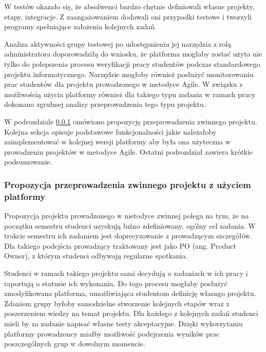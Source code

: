 W testów okazało się, że absolwenci bardzo chętnie definiowali własne projekty, etapy, integracje.
Z zaangażowaniem dodawali oni przypadki testowe i tworzyli programy spełniające założenia kolejnych zadań.

Analiza aktywności grupy testowej po udostępnieniu jej narzędzia z rolą administratora doporowadziłą do wniosku, że platforma mogłaby zostać użyta nie tylko do polepszenia procesu weryfikacji pracy studentów podczas standardowego projektu informatycznego.
Narzędzie mogłoby również posłużyć monitorowaniu prac studentów dla projektu prowadzonego w metodyce Agile.
W związku z możliwością użycia platformy również dla takiego typu zadania w ramach pracy dokonano zgrubnej analizy przeprowadzenia tego typu projektu.

W podrozdziale \ref{agile_proposition} omówiono propozycję przeprowadzenia zwinnego projektu.
Kolejna sekcja opisuje podstawowe funkcjonalności jakie należałoby zaimplementować w kolejnej wersji platformy aby była ona użyteczna w prowadzeniu projektów w metodyce Agile.
Ostatni podrozdział zawiera krótkie podsumowanie.

\subsubsection{Propozycja przeprowadzenia zwinnego projektu z użyciem platformy}
\label{agile_proposition}

Propozycja projektu prowadzonego w metodyce zwinnej polega na tym, że na początku semestru studenci uzyskują luźno zdefiniowany, ogólny cel zadania.
W trakcie semestru ich zadaniem jest doprecyzowanie z prowadzącym szczegółów.
Dla takiego podejścia prowadzący traktowany jest jako PO (ang. Product Owner), z którym studenci odbywają regularne spotkania.

Studenci w ramach takiego projektu sami decydują o zadaniach w ich pracy i raportują o statusie ich wykonania.
Do tego procesu mogłaby posłużyć zmodyfikowana platforma, umożliwiająca studentom definicję własngo projektu.
Zdaniem grupy byłoby samodzielne stworzenie kolejnych etapów wraz z poszerzeniem wiedzy na temat projektu.
Dla każdego z kolejnych zadań studenci mieli by za zadanie napisać własne testy akceptacyjne.
Dzięki wykorzytaniu platformy prowadzoncy miałby możliwość podejrzenia wyników prac poszczególnych grup w dowolnym momencie.


